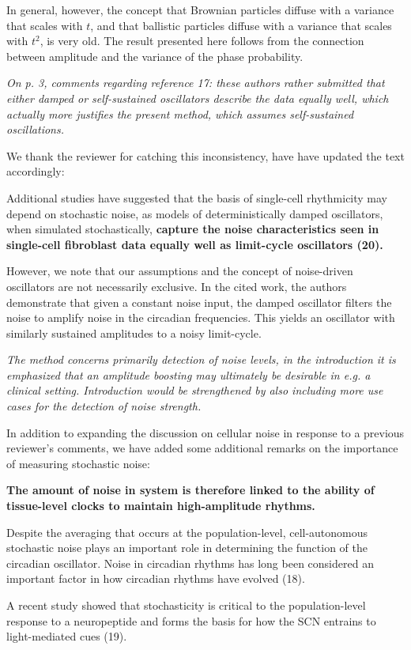 \documentclass[11pt, letterpaper]{article}
\newenvironment{reviewer}{\itshape\color{gray}}{}
\newenvironment{manuscript}[1]{\begin{center}\begin{tcolorbox}[colback=green!5!white,colframe=green!75!black,width=\textwidth,title={#1},breakable,fonttitle=\bfseries]}{\end{tcolorbox}\end{center}}
\begin{document}
In general, however, the concept that Brownian particles diffuse with a variance that scales with $t$, and that ballistic particles diffuse with a variance that scales with $t^2$, is very old. The result presented here follows from the connection between amplitude and the variance of the phase probability.

\begin{reviewer}
On p. 3, comments regarding reference 17: these authors rather submitted that either damped or self-sustained oscillators describe the data equally well, which actually more justifies the present method, which assumes self-sustained oscillations.
\end{reviewer}

We thank the reviewer for catching this inconsistency, have have updated the text accordingly:

\begin{manuscript}{Page 3}
  Additional studies have suggested that the basis of single-cell rhythmicity may depend on stochastic noise, as models of deterministically damped oscillators, when simulated stochastically, {\bfseries capture the noise characteristics seen in single-cell fibroblast data equally well as limit-cycle oscillators (20).}
\end{manuscript}

However, we note that our assumptions and the concept of noise-driven oscillators are not necessarily exclusive. In the cited work, the authors demonstrate that given a constant noise input, the damped oscillator filters the noise to amplify noise in the circadian frequencies. This yields an oscillator with similarly sustained amplitudes to a noisy limit-cycle.

\begin{reviewer}
The method concerns primarily detection of noise levels, in the introduction it is emphasized that an amplitude boosting may ultimately be desirable in e.g. a clinical setting. Introduction would be strengthened by also including more use cases for the detection of noise strength.
\end{reviewer}

In addition to expanding the discussion on cellular noise in response to a previous reviewer's comments, we have added some additional remarks on the importance of measuring stochastic noise:

\begin{manuscript}{Page 3}
  {\bfseries
  The amount of noise in system is therefore linked to the ability of tissue-level clocks to maintain high-amplitude rhythms. 

Despite the averaging that occurs at the population-level, cell-autonomous stochastic noise plays an important role in determining the function of the circadian oscillator. Noise in circadian rhythms has long been considered an important factor in how circadian rhythms have evolved (18).} A recent study showed that stochasticity is critical to the population-level response to a neuropeptide and forms the basis for how the SCN entrains to light-mediated cues (19).
\end{manuscript}
\end{document}
